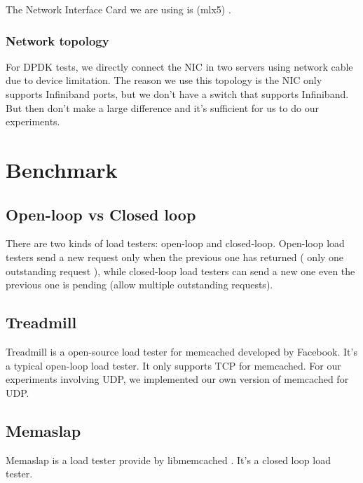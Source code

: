 \documentclass[bsc,frontabs,twoside,singlespacing,parskip,deptreport]{infthesis}     %
\begin{document}
The Network Interface Card we are using is (mlx5) \cite{P1} .


\subsubsection{Network topology}

For DPDK tests, we directly connect the NIC in two servers using network cable due to device limitation. The reason we use this topology is the NIC only supports Infiniband ports, but we don't have a switch that supports Infiniband. But then don't make a large difference and it's sufficient for us to do our experiments.






\section{Benchmark}


\subsection{Open-loop vs Closed loop}

There are two kinds of load testers: open-loop and closed-loop. Open-loop load testers send a new request only when the previous one has returned ( only one outstanding request ), while closed-loop load testers can send a new one even the previous one is pending (allow multiple outstanding requests).



\subsection{Treadmill}

Treadmill \cite{DBLP:conf/isca/ZhangMMT16} is a open-source load tester for memcached developed by Facebook. It's a typical open-loop load tester. It only supports TCP for memcached. For our experiments involving UDP, we implemented our own version of memcached for UDP.



\subsection{Memaslap}

Memaslap is a load tester provide by libmemcached \cite{P2}. It's a closed loop load tester.  
\end{document}
